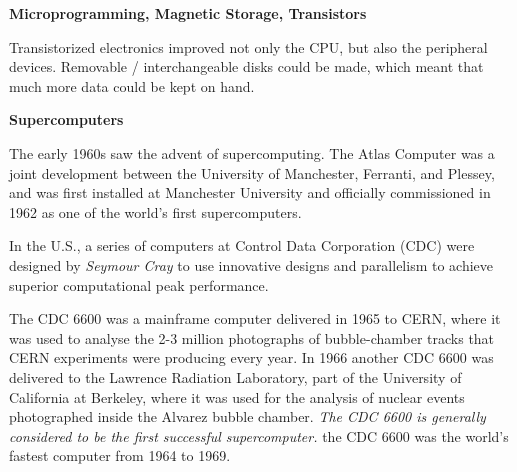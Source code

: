 \documentclass[12pt]{article}
\begin{document}
\vspace*{2em}
\noindent \textbf{Microprogramming, Magnetic Storage, Transistors}

Transistorized electronics improved not only the CPU, but also the peripheral devices. Removable / interchangeable disks could be made, which meant that much more data could be kept on hand.

\vspace*{2em}
\noindent \textbf{Supercomputers}

The early 1960s saw the advent of supercomputing. The Atlas Computer was a joint development between the University of Manchester, Ferranti, and Plessey, and was first installed at Manchester University and officially commissioned in 1962 as one of the world's first supercomputers.%

In the U.S., a series of computers at Control Data Corporation (CDC) were designed by \textit{Seymour Cray} to use innovative designs and parallelism to achieve superior computational peak performance.

The CDC 6600 was a mainframe computer delivered in 1965 to CERN, where it was used to analyse the 2-3 million photographs of bubble-chamber tracks that CERN experiments were producing every year. In 1966 another CDC 6600 was delivered to the Lawrence Radiation Laboratory, part of the University of California at Berkeley, where it was used for the analysis of nuclear events photographed inside the Alvarez bubble chamber. \textit{The CDC 6600 is generally considered to be the first successful supercomputer.} the CDC 6600 was the world's fastest computer from 1964 to 1969.
\end{document}
